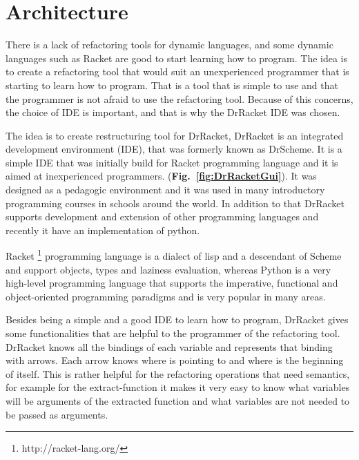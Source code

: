 
% 
% 

\section{Architecture}

There is a lack of refactoring tools for dynamic languages, and some dynamic languages such as Racket are good to start learning how to program.
The idea is to create a refactoring tool that would suit an unexperienced programmer that is starting to learn how to program. That is a tool that is simple to use and that the programmer is not afraid to use the refactoring tool.
Because of this concerns, the choice of IDE is important, and that is why the DrRacket IDE was chosen.

The idea is to create restructuring tool for DrRacket, DrRacket is an integrated development environment (IDE), that was formerly known as DrScheme. It is a simple IDE that was initially build for Racket programming language and it is aimed at inexperienced programmers. ({\bf Fig.~\ref{fig:DrRacketGui}}).
It was designed as a pedagogic environment \cite{drscheme_pegadogy} and it was used in many introductory programming courses in schools around the world. In addition to that DrRacket supports development and extension of other programming languages \cite{tobin2011languages} and recently it have an implementation of python. \cite{ramos2014implementation}


Racket \footnote{http://racket-lang.org/} programming language is a dialect of lisp and a descendant of Scheme and support objects, types and laziness evaluation,
whereas Python is a very high-level programming language that supports the imperative, functional and object-oriented programming paradigms and is very popular in many areas.

Besides being a simple and a good IDE to learn how to program, DrRacket gives some functionalities that are helpful to the programmer of the refactoring tool. DrRacket knows all the bindings of each variable and represents that binding with arrows. Each arrow knows where is pointing to and where is the beginning of itself. This is rather helpful for the refactoring operations that need semantics, for example for the extract-function it makes it very easy to know what variables will be arguments of the extracted function and what variables are not needed to be passed as arguments.

